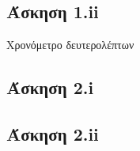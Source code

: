 \documentclass[a4paper,10pt]{article} \usepackage{anysize}
\begin{document}


\section*{} \setcounter{section}{1}
\subsection*{Άσκηση 1.ii}\setcounter{subsection}{1}
Χρονόμετρο δευτερολέπτων


\subsection*{Άσκηση 2.i}

\subsection*{Άσκηση 2.ii}

\end{document}
